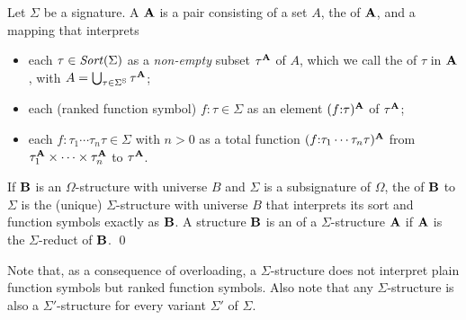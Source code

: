 \begin{definition}
Let $\Sigma$ be a signature.
A  $\mathbf{A}$ is a pair consisting of 
a set $A$,  the  of $\mathbf{A}$, and 
a mapping that interprets 

\begin{itemize}
\item
each $\tau \in \mathit{Sort}(\Sigma)$ as a \emph{non-empty} subset $\tau^{\mathbf{A}}$ of $A$,
which we call the  of $\tau$ in $\mathbf{A}$,
with $A = \bigcup_{\tau \in \Sigma^\mathrm{S}} \tau^{\mathbf{A}}$;

\item
each (ranked function symbol) $f{:}\tau \in \Sigma$ 
as an element $(f{:}\tau)^{\mathbf{A}}$ of  $\tau^{\mathbf{A}}$;

\item
each $f{:}\tau_1\cdots\tau_n\tau \in \Sigma$ with $n > 0$ 
as a total function 
$(f{:}\tau_1\cdots\tau_n\tau)^{\mathbf{A}}$ 
from $\tau_1^{\mathbf{A}} \times \cdots \times \tau_n^{\mathbf{A}}$ to $\tau^{\mathbf{A}}$.
\end{itemize}

If $\mathbf{B}$ is an $\Omega$-structure with universe $B$ and 
$\Sigma$ is a subsignature of $\Omega$,
the  of $\mathbf{B}$ to $\Sigma$ is the (unique) 
$\Sigma$-structure with universe $B$
that interprets its sort and function symbols exactly as $\mathbf{B}$.
A structure $\mathbf{B}$ is an  of a $\Sigma$-structure $\mathbf{A}$
if $\mathbf{A}$ is the $\Sigma$-reduct of $\mathbf{B}$.
\qed
\end{definition}

Note that, as a consequence of overloading,
a $\Sigma$-structure does not interpret plain function symbols
but ranked function symbols.
Also note that 
any $\Sigma$-structure is also a $\Sigma'$-structure 
for every variant $\Sigma'$ of $\Sigma$.


